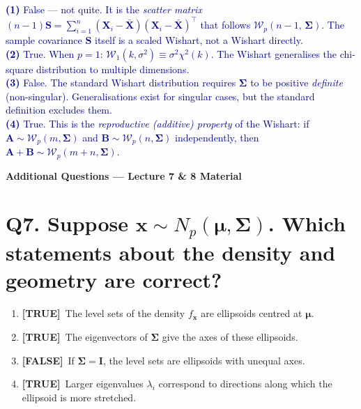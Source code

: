 \documentclass[12pt, a4paper]{article}
\newcommand{\T}{\textcolor{truegreen}{\textbf{[TRUE]}}}
\newcommand{\F}{\textcolor{falsered}{\textbf{[FALSE]}}}
\newcommand{\expl}[1]{\textcolor{darkblue}{\small #1}}
\begin{document}
\expl{
\textbf{(1)} False --- not quite. It is the \textit{scatter matrix} $(n-1)\mathbf{S} = \sum_{i=1}^n (\mathbf{X}_i - \bar{\mathbf{X}})(\mathbf{X}_i - \bar{\mathbf{X}})^\top$ that follows $\mathcal{W}_p(n-1,\, \boldsymbol{\Sigma})$. The sample covariance $\mathbf{S}$ itself is a scaled Wishart, not a Wishart directly.\\
\textbf{(2)} True. When $p = 1$: $\mathcal{W}_1(k, \sigma^2) \equiv \sigma^2 \chi^2(k)$. The Wishart generalises the chi-square distribution to multiple dimensions.\\
\textbf{(3)} False. The standard Wishart distribution requires $\boldsymbol{\Sigma}$ to be positive \textit{definite} (non-singular). Generalisations exist for singular cases, but the standard definition excludes them.\\
\textbf{(4)} True. This is the \textit{reproductive (additive) property} of the Wishart: if $\mathbf{A} \sim \mathcal{W}_p(m, \boldsymbol{\Sigma})$ and $\mathbf{B} \sim \mathcal{W}_p(n, \boldsymbol{\Sigma})$ independently, then $\mathbf{A} + \mathbf{B} \sim \mathcal{W}_p(m+n, \boldsymbol{\Sigma})$.
}



\vspace{2em}
\begin{center}
  {\large \textbf{Additional Questions --- Lecture 7 \& 8 Material}}
\end{center}
\vspace{0.5em}

\section*{Q7. Suppose $\mathbf{x} \sim N_p(\boldsymbol{\mu}, \boldsymbol{\Sigma})$. Which statements about the density and geometry are correct?}

\begin{enumerate}[label=(\arabic*)]
  \item \T\ The level sets of the density $f_{\mathbf{x}}$ are ellipsoids centred at $\boldsymbol{\mu}$.
  \item \T\ The eigenvectors of $\boldsymbol{\Sigma}$ give the axes of these ellipsoids.
  \item \F\ If $\boldsymbol{\Sigma} = \mathbf{I}$, the level sets are ellipsoids with unequal axes.
  \item \T\ Larger eigenvalues $\lambda_i$ correspond to directions along which the ellipsoid is more stretched.
\end{enumerate}
\end{document}
